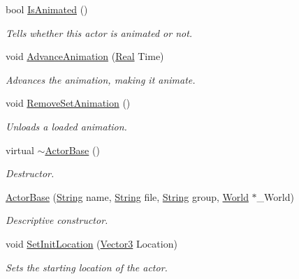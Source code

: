 \begin{DoxyCompactItemize}
bool \hyperlink{classphys_1_1ActorBase_ac98f9fdae0da939e352f8fcff217457c}{IsAnimated} ()
\begin{DoxyCompactList}\small\item\em Tells whether this actor is animated or not. \item\end{DoxyCompactList}\item 
void \hyperlink{classphys_1_1ActorBase_a37d5a8a3ae4ca3c6e7d14706096faa85}{AdvanceAnimation} (\hyperlink{namespacephys_af7eb897198d265b8e868f45240230d5f}{Real} Time)
\begin{DoxyCompactList}\small\item\em Advances the animation, making it animate. \item\end{DoxyCompactList}\item 
void \hyperlink{classphys_1_1ActorBase_ac42e5e47504d7f296bb0a2bedc2ded07}{RemoveSetAnimation} ()
\begin{DoxyCompactList}\small\item\em Unloads a loaded animation. \item\end{DoxyCompactList}\item 
virtual \hyperlink{classphys_1_1ActorBase_a5e5d4b50c83c6851e554b5e7ad65403f}{$\sim$ActorBase} ()
\begin{DoxyCompactList}\small\item\em Destructor. \item\end{DoxyCompactList}\item 
\hyperlink{classphys_1_1ActorBase_ad9d90a68921ce81653e9950c1330809d}{ActorBase} (\hyperlink{namespacephys_aa03900411993de7fbfec4789bc1d392e}{String} name, \hyperlink{namespacephys_aa03900411993de7fbfec4789bc1d392e}{String} file, \hyperlink{namespacephys_aa03900411993de7fbfec4789bc1d392e}{String} group, \hyperlink{classphys_1_1World}{World} $\ast$\_\-World)
\begin{DoxyCompactList}\small\item\em Descriptive constructor. \item\end{DoxyCompactList}\item 
void \hyperlink{classphys_1_1ActorBase_a0ff0980bcf33a8205eb058b8caa1f36b}{SetInitLocation} (\hyperlink{classphys_1_1Vector3}{Vector3} Location)
\begin{DoxyCompactList}\small\item\em Sets the starting location of the actor. \item\end{DoxyCompactList}\item 

\end{DoxyCompactItemize}
